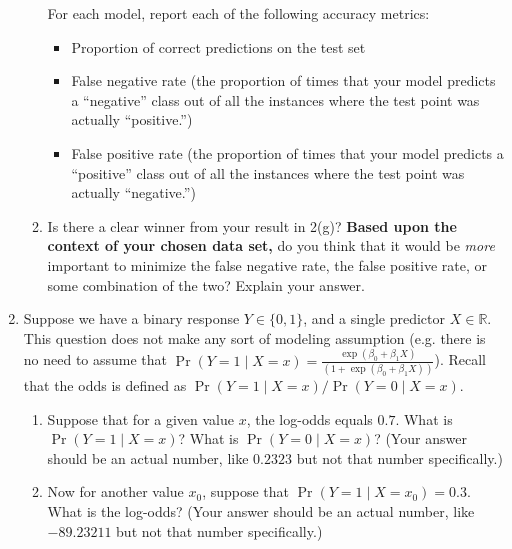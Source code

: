 \documentclass[12pt]{article}
\begin{document}
\begin{enumerate}
\begin{enumerate}
\bigskip

For each model, report each of the following accuracy metrics:
\begin{itemize}
    \item Proportion of correct predictions on the test set
    \item False negative rate (the proportion of times that your model predicts a ``negative'' class out of all the instances where the test point was actually ``positive.'')
    \item False positive rate (the proportion of times that your model predicts a ``positive'' class out of all the instances where the test point was actually ``negative.'')
\end{itemize}

\item Is there a clear winner from your result in 2(g)? \textbf{Based upon the context of your chosen data set,} do you think that it would be \textit{more} important to minimize the false negative rate, the false positive rate, or some combination of the two? Explain your answer.

\end{enumerate}

  \item  Suppose we have a binary response $Y \in \{0,1\}$, and a single predictor $X \in \mathbb{R}$.
  This question does not make   any sort of modeling assumption (e.g. there is no need to assume that $\Pr(Y=1 \mid X=x) = \frac{\exp(\beta_0 + \beta_1 X)}{\left( 1+\exp(\beta_0 + \beta_1 X) \right)}$).  Recall that the odds is defined as $\Pr(Y=1 \mid X=x)  /\Pr(Y=0 \mid X=x) $. 
 \begin{enumerate}
 \item Suppose  that for a given value $x$, the  log-odds equals $0.7$. What is $\Pr(Y=1 \mid X=x)$?  What is $\Pr(Y=0 \mid X=x)$? (Your answer should be an actual number, like $0.2323$ but not that number specifically.)
 \item Now for another value $x_0$, suppose that $\Pr(Y=1 \mid X=x_0)=0.3$. What is the log-odds? (Your answer should be an actual number, like $-89.23211$ but not that number specifically.)
 \end{enumerate}


\end{enumerate}
\end{document}
